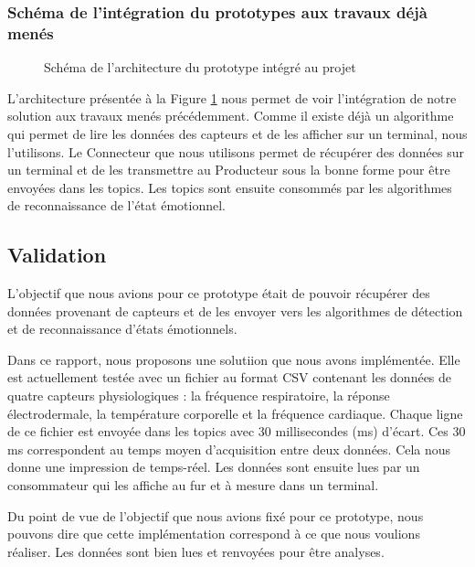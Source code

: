 \documentclass{article}
\begin{document}
		\subsubsection{Schéma de l'intégration du prototypes aux travaux déjà menés}\label{sec:schematravaux}
			\begin{figure}
				\centering
				\vspace*{-1cm}
				\caption{Schéma de l'architecture du prototype intégré au projet}
				\label{fig:archiglobale}
			\end{figure}
			L'architecture présentée à la Figure \ref{fig:archiglobale} nous permet de voir l'intégration de notre solution aux travaux menés précédemment.
			Comme il existe déjà un algorithme qui permet de lire les données des capteurs et de les afficher sur un terminal, nous l'utilisons.
			Le Connecteur que nous utilisons permet de récupérer des données sur un terminal et de les transmettre au Producteur sous la bonne forme pour être envoyées dans les topics.
			Les topics sont ensuite consommés par les algorithmes de reconnaissance de l'état émotionnel.
	\subsection{Validation}\label{sec:validation}
		L'objectif que nous avions pour ce prototype était de pouvoir récupérer des données provenant de capteurs et de les envoyer vers les algorithmes de détection et de reconnaissance d'états émotionnels.\par
		Dans ce rapport, nous proposons une solutiion que nous avons implémentée.
		Elle est actuellement testée avec un fichier au format CSV contenant les données de quatre capteurs physiologiques : la fréquence respiratoire, la réponse électrodermale, la température corporelle et la fréquence cardiaque. 
		Chaque ligne de ce fichier est envoyée dans les topics avec 30 millisecondes (ms) d'écart.
		Ces 30 ms correspondent au temps moyen d'acquisition entre deux données.
		Cela nous donne une impression de temps-réel. 
		Les données sont ensuite lues par un consommateur qui les affiche au fur et à mesure dans un terminal.\par
		Du point de vue de l'objectif que nous avions fixé pour ce prototype, nous pouvons dire que cette implémentation correspond à ce que nous voulions réaliser.
		Les données sont bien lues et renvoyées pour être analyses.
\end{document}

